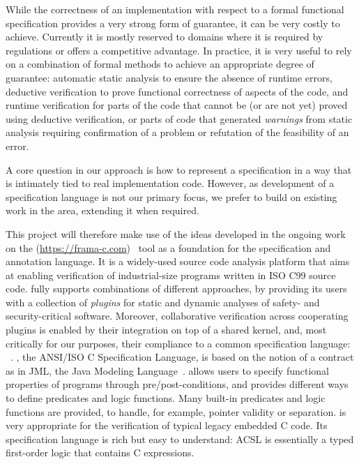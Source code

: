 While the correctness of an implementation with respect to a formal functional specification provides a very strong form of guarantee, it can be very costly to achieve.
Currently it is mostly reserved to domains where it is required by regulations or offers a competitive advantage.
In practice, it is very useful to rely on a combination of formal methods to achieve an appropriate degree of guarantee:
automatic static analysis to ensure the absence of runtime errors,
deductive verification to prove functional correctness of aspects of the code,
and runtime verification for parts of the code that cannot be (or are not yet) proved using deductive verification,
or parts of code that generated \emph{warnings} from static analysis requiring confirmation of a problem or refutation of the feasibility of an error.

A core question in our approach is how to represent a specification in a way that is intimately tied to real implementation code.  However, as development of a specification language is not our primary focus, we prefer to build on existing work in the area, extending it when required.

This project will therefore make use of the ideas developed in the ongoing work on the \framac{} (\url{https://frama-c.com})~\cite{KKP2015:FAC} tool as a foundation for the specification and annotation language.
It is a widely-used source code analysis platform that aims at enabling verification of industrial-size programs written in ISO C99 source code.
\framac{} fully supports combinations of different approaches, by providing its users with a collection of \emph{plugins} for static and dynamic analyses of safety- and security-critical software.
Moreover, collaborative verification across cooperating plugins is enabled by their integration on top of a shared kernel, and, most critically for our purposes, their compliance to a common specification language: \acsl~\cite{ACSL}.
\acsl, the ANSI/ISO C Specification Language, is based on the notion of a contract as in JML, the Java Modeling Language~\cite{jml}.
\acsl allows users to specify functional properties of programs through pre/post-conditions, and provides different ways to define predicates and logic functions.
Many built-in predicates and logic functions are provided, to handle, for example, pointer validity or separation.
\framac is very appropriate for the verification of typical legacy embedded C code.
Its specification language is rich but easy to understand: ACSL is essentially a typed first-order logic that contains C expressions.

